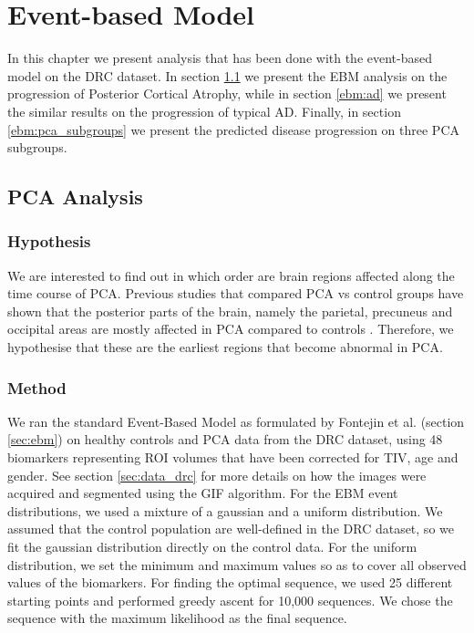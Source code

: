 \chapter{Event-based Model}
\label{chapter:ebm}

\newcommand{\scaleF}{0.6}

In this chapter we present analysis that has been done with the event-based model on the DRC dataset. In section \ref{ebm:pca} we present the EBM analysis on the progression of Posterior Cortical Atrophy, while in section \ref{ebm:ad} we present the similar results on the progression of typical AD. Finally, in section \ref{ebm:pca_subgroups} we present the predicted disease progression on three PCA subgroups.

\section{PCA Analysis}
\label{ebm:pca}


\subsection{Hypothesis}

We are interested to find out in which order are brain regions affected along the time course of PCA. Previous studies that compared PCA vs control groups have shown that the posterior parts of the brain, namely the parietal, precuneus and occipital areas are mostly affected in PCA compared to controls \cite{lehmann2011cortical,whitwell2007imaging}. Therefore, we hypothesise that these are the earliest regions that become abnormal in PCA. 

\subsection{Method}
\label{ebm:pcaMethod}

We ran the standard Event-Based Model as formulated by Fontejin et al. \cite{fonteijn2012event} (section \ref{sec:ebm}) on healthy controls and PCA data from the DRC dataset, using 48 biomarkers representing ROI volumes that have been corrected for TIV, age and gender. See section \ref{sec:data_drc} for more details on how the images were acquired and segmented using the GIF algorithm. For the EBM event distributions, we used a mixture of a gaussian and a uniform distribution. We assumed that the control population are well-defined in the DRC dataset, so we fit the gaussian distribution directly on the control data. For the uniform distribution, we set the minimum and maximum values so as to cover all observed values of the biomarkers. For finding the optimal sequence, we used 25 different starting points and performed greedy ascent for 10,000 sequences. We chose the sequence with the maximum likelihood as the final sequence. 

